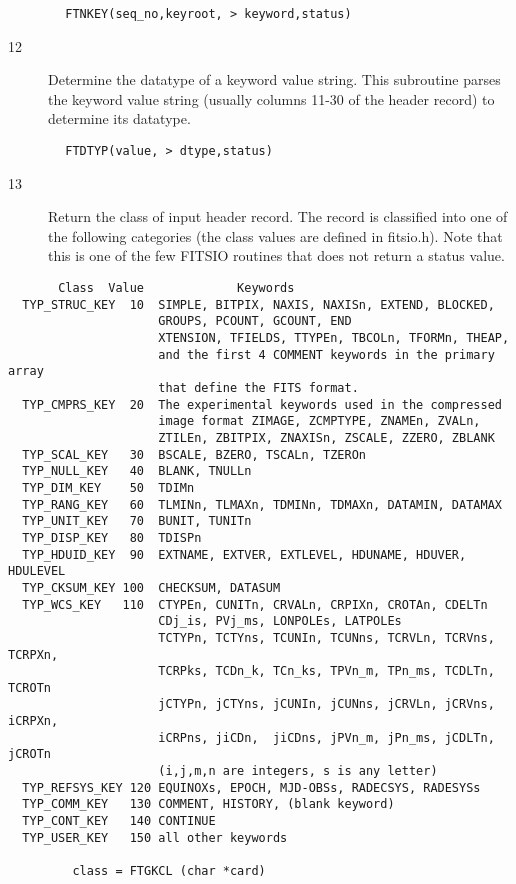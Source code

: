 \documentclass[11pt]{book}
\begin{document}
\begin{verbatim}
        FTNKEY(seq_no,keyroot, > keyword,status)
\end{verbatim}

\begin{description}
\item[12] Determine the datatype of a keyword value string.
    This subroutine parses the keyword value string (usually columns 11-30
   of the header record) to determine its datatype.
\end{description}

\begin{verbatim}
        FTDTYP(value, > dtype,status)
\end{verbatim}

\begin{description}
\item[13] Return the class of input header record.  The record is classified
    into one of the following categories (the class values are
    defined in fitsio.h).  Note that this is one of the few FITSIO
   routines that does not return a status value.
\end{description}

\begin{verbatim}
       Class  Value             Keywords
  TYP_STRUC_KEY  10  SIMPLE, BITPIX, NAXIS, NAXISn, EXTEND, BLOCKED,
                     GROUPS, PCOUNT, GCOUNT, END
                     XTENSION, TFIELDS, TTYPEn, TBCOLn, TFORMn, THEAP,
                     and the first 4 COMMENT keywords in the primary array
                     that define the FITS format.
  TYP_CMPRS_KEY  20  The experimental keywords used in the compressed
                     image format ZIMAGE, ZCMPTYPE, ZNAMEn, ZVALn,
                     ZTILEn, ZBITPIX, ZNAXISn, ZSCALE, ZZERO, ZBLANK
  TYP_SCAL_KEY   30  BSCALE, BZERO, TSCALn, TZEROn
  TYP_NULL_KEY   40  BLANK, TNULLn
  TYP_DIM_KEY    50  TDIMn
  TYP_RANG_KEY   60  TLMINn, TLMAXn, TDMINn, TDMAXn, DATAMIN, DATAMAX
  TYP_UNIT_KEY   70  BUNIT, TUNITn
  TYP_DISP_KEY   80  TDISPn
  TYP_HDUID_KEY  90  EXTNAME, EXTVER, EXTLEVEL, HDUNAME, HDUVER, HDULEVEL
  TYP_CKSUM_KEY 100  CHECKSUM, DATASUM
  TYP_WCS_KEY   110  CTYPEn, CUNITn, CRVALn, CRPIXn, CROTAn, CDELTn
                     CDj_is, PVj_ms, LONPOLEs, LATPOLEs
                     TCTYPn, TCTYns, TCUNIn, TCUNns, TCRVLn, TCRVns, TCRPXn,
                     TCRPks, TCDn_k, TCn_ks, TPVn_m, TPn_ms, TCDLTn, TCROTn
                     jCTYPn, jCTYns, jCUNIn, jCUNns, jCRVLn, jCRVns, iCRPXn,
                     iCRPns, jiCDn,  jiCDns, jPVn_m, jPn_ms, jCDLTn, jCROTn
                     (i,j,m,n are integers, s is any letter)
  TYP_REFSYS_KEY 120 EQUINOXs, EPOCH, MJD-OBSs, RADECSYS, RADESYSs
  TYP_COMM_KEY   130 COMMENT, HISTORY, (blank keyword)
  TYP_CONT_KEY   140 CONTINUE
  TYP_USER_KEY   150 all other keywords

         class = FTGKCL (char *card)
\end{verbatim}
\end{document}
